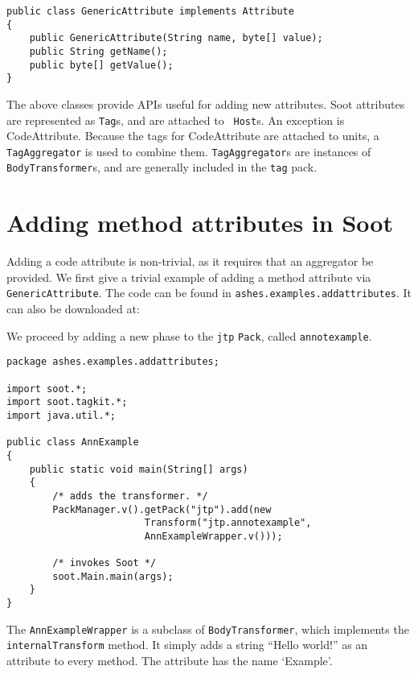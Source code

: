 \documentclass{article}
\begin{document}
\begin{description}
\begin{verbatim}
public class GenericAttribute implements Attribute
{
    public GenericAttribute(String name, byte[] value);
    public String getName();
    public byte[] getValue();
}    
\end{verbatim}
\end{description}
     
The above classes provide APIs useful for adding new attributes. Soot
attributes are represented as {\tt Tag}s, and are attached to {\tt
Host}s.  An exception is CodeAttribute. Because the tags for
CodeAttribute are attached to units, a {\tt TagAggregator} is used to
combine them. {\tt TagAggregator}s are instances of {\tt BodyTransformer}s,
and are generally included in the {\tt tag} pack.

\section{Adding method attributes in Soot}
Adding a code attribute is non-trivial, as it requires that an aggregator
be provided.  We first give a trivial example of adding a method attribute
via {\tt GenericAttribute}. The code can be found in {\tt ashes.examples.addattributes}.
It can also be downloaded at:


We proceed by adding a new phase to the {\tt jtp} {\tt Pack}, called
{\tt annotexample}.

\begin{verbatim}
package ashes.examples.addattributes;

import soot.*;
import soot.tagkit.*;
import java.util.*;

public class AnnExample
{
    public static void main(String[] args)
    {
        /* adds the transformer. */
        PackManager.v().getPack("jtp").add(new
                        Transform("jtp.annotexample",
                        AnnExampleWrapper.v()));

        /* invokes Soot */
        soot.Main.main(args);
    }
}
\end{verbatim}

The {\tt AnnExampleWrapper} is a subclass of {\tt BodyTransformer},
which implements the {\tt internalTransform} method. It simply
adds a string ``Hello world!'' as an attribute to every method.
The attribute has the name `Example'.
\end{document}
